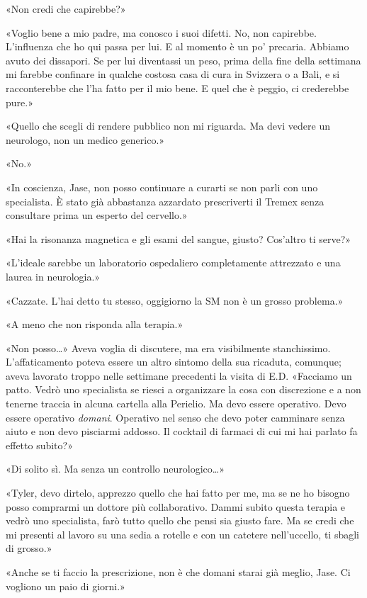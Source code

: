 «Non credi che capirebbe?»

«Voglio bene a mio padre, ma conosco i suoi difetti. No, non capirebbe.
L'influenza che ho qui passa per lui. E al momento è un po' precaria.
Abbiamo avuto dei dissapori. Se per lui diventassi un peso, prima della
fine della settimana mi farebbe confinare in qualche costosa casa di
cura in Svizzera o a Bali, e si racconterebbe che l'ha fatto per il mio
bene. E quel che è peggio, ci crederebbe pure.»

«Quello che scegli di rendere pubblico non mi riguarda. Ma devi vedere
un neurologo, non un medico generico.»

«No.»

«In coscienza, Jase, non posso continuare a curarti se non parli con uno
specialista. È stato già abbastanza azzardato prescriverti il Tremex
senza consultare prima un esperto del cervello.»

«Hai la risonanza magnetica e gli esami del sangue, giusto? Cos'altro ti
serve?»

«L'ideale sarebbe un laboratorio ospedaliero completamente attrezzato e
una laurea in neurologia.»

«Cazzate. L'hai detto tu stesso, oggigiorno la SM non è un grosso
problema.»

«A meno che non risponda alla terapia.»

«Non posso\ldots» Aveva voglia di discutere, ma era visibilmente
stanchissimo. L'affaticamento poteva essere un altro sintomo della sua
ricaduta, comunque; aveva lavorato troppo nelle settimane precedenti la
visita di E.D. «Facciamo un patto. Vedrò uno specialista se riesci a
organizzare la cosa con discrezione e a non tenerne traccia in alcuna
cartella alla Perielio. Ma devo essere operativo. Devo essere operativo
\emph{domani}. Operativo nel senso che devo poter camminare senza aiuto
e non devo pisciarmi addosso. Il cocktail di farmaci di cui mi hai
parlato fa effetto subito?»

«Di solito sì. Ma senza un controllo neurologico\ldots»

«Tyler, devo dirtelo, apprezzo quello che hai fatto per me, ma se ne ho
bisogno posso comprarmi un dottore più collaborativo. Dammi subito
questa terapia e vedrò uno specialista, farò tutto quello che pensi sia
giusto fare. Ma se credi che mi presenti al lavoro su una sedia a
rotelle e con un catetere nell'uccello, ti sbagli di grosso.»

«Anche se ti faccio la prescrizione, non è che domani starai già meglio,
Jase. Ci vogliono un paio di giorni.»

